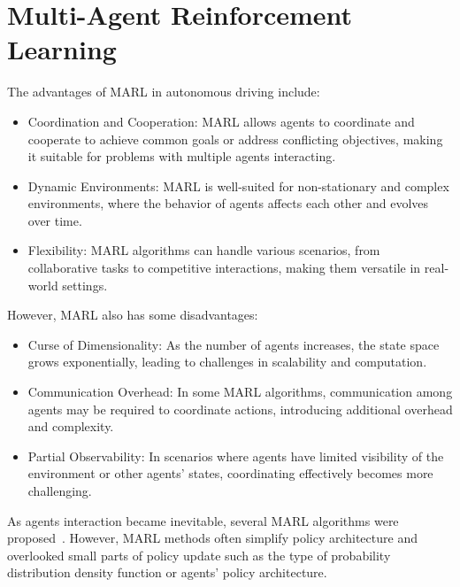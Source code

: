 \section{Multi-Agent Reinforcement Learning}\label{sec:multi-agent-reinforcement-learning}
The advantages of MARL in autonomous driving include:
\begin{itemize}
    \item Coordination and Cooperation: MARL allows agents to coordinate and cooperate to achieve common goals or address conflicting objectives, making it suitable for problems with multiple agents interacting.
    \item Dynamic Environments: MARL is well-suited for non-stationary and complex environments, where the behavior of agents affects each other and evolves over time.
    \item Flexibility: MARL algorithms can handle various scenarios, from collaborative tasks to competitive interactions, making them versatile in real-world settings.
\end{itemize}
However, MARL also has some disadvantages:
\begin{itemize}
    \item Curse of Dimensionality: As the number of agents increases, the state space grows exponentially, leading to challenges in scalability and computation.
    \item Communication Overhead: In some MARL algorithms, communication among agents may be required to coordinate actions, introducing additional overhead and complexity.
    \item Partial Observability: In scenarios where agents have limited visibility of the environment or other agents' states, coordinating effectively becomes more challenging.
\end{itemize}
As agents interaction became inevitable, several MARL
algorithms were proposed~\cite{peng2021learning, yang2018mean, johanson2021emergent, tang2020towards, oroojlooyjadid2019review, siekmann1998agent, zhou2020smarts, zhang2019multiagent}.
However, MARL methods often simplify policy architecture and overlooked small parts of policy update such as the type of probability distribution density function or agents' policy architecture.